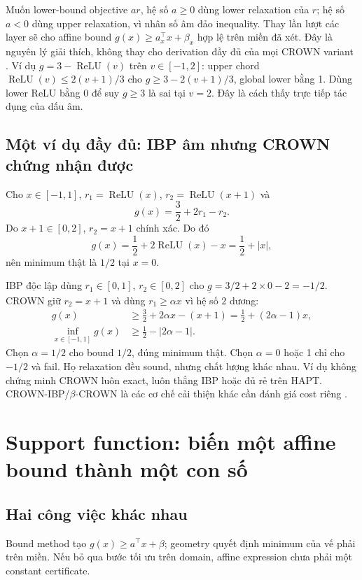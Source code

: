 \documentclass[11pt,a4paper]{article}
\newcommand{\relu}{\operatorname{ReLU}}
\theoremstyle{definition}
\begin{document}
Muốn lower-bound objective $a r$, hệ số $a\ge0$ dùng lower relaxation của
$r$; hệ số $a<0$ dùng upper relaxation, vì nhân số âm đảo inequality.
Thay lần lượt các layer sẽ cho affine bound
$g(x)\ge a_x^\top x+\beta_x$ hợp lệ trên miền đã xét. Đây là nguyên lý
giải thích, không thay cho derivation đầy đủ của mọi CROWN variant
\cite{crown,lirpa}. Ví dụ $g=3-\relu(v)$ trên $v\in[-1,2]$:
upper chord $\relu(v)\le2(v+1)/3$ cho
$g\ge3-2(v+1)/3$, global lower bằng 1. Dùng lower ReLU bằng 0 để suy
$g\ge3$ là sai tại $v=2$. Đây là cách thấy trực tiếp tác dụng của dấu âm.

\subsection{Một ví dụ đầy đủ: IBP âm nhưng CROWN chứng nhận được}
Cho $x\in[-1,1]$, $r_1=\relu(x)$, $r_2=\relu(x+1)$ và
\begin{equation}
g(x)=\frac32+2r_1-r_2.
\end{equation}
Do $x+1\in[0,2]$, $r_2=x+1$ chính xác. Do đó
\begin{equation}
g(x)=\frac12+2\relu(x)-x=\frac12+|x|,
\end{equation}
nên minimum thật là $1/2$ tại $x=0$.

IBP độc lập dùng $r_1\in[0,1]$, $r_2\in[0,2]$ cho
$\underline g=3/2+2\times0-2=-1/2$. CROWN giữ $r_2=x+1$ và dùng
$r_1\ge\alpha x$ vì hệ số $2$ dương:
\begin{align}
g(x)&\ge\frac32+2\alpha x-(x+1)
=\frac12+(2\alpha-1)x,\\
\inf_{x\in[-1,1]}g(x)&\ge\frac12-|2\alpha-1|.
\end{align}
Chọn $\alpha=1/2$ cho bound $1/2$, đúng minimum thật. Chọn $\alpha=0$
hoặc 1 chỉ cho $-1/2$ và fail. Họ relaxation đều sound, nhưng chất lượng
khác nhau. Ví dụ không chứng minh CROWN luôn exact, luôn thắng IBP hoặc
đủ rẻ trên HAPT. CROWN-IBP/$\beta$-CROWN là các cơ chế cải thiện khác cần
đánh giá cost riêng \cite{crownibp,betacrown}.

\section{Support function: biến một affine bound thành một con số}
\subsection{Hai công việc khác nhau}
Bound method tạo $g(x)\ge a^\top x+\beta$; geometry quyết định minimum của
vế phải trên miền. Nếu bỏ qua bước tối ưu trên domain, affine expression
chưa phải một constant certificate.
\end{document}
